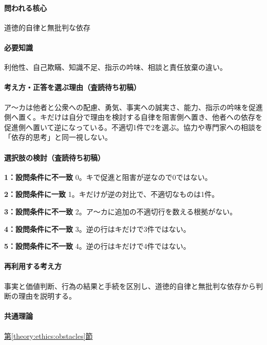 \paragraph{問われる核心} 道徳的自律と無批判な依存

\paragraph{必要知識} 利他性、自己欺瞞、知識不足、指示の吟味、相談と責任放棄の違い。

\paragraph{考え方・正答を選ぶ理由（査読待ち初稿）} ア〜カは他者と公衆への配慮、勇気、事実への誠実さ、能力、指示の吟味を促進側へ置く。キだけは自分で理由を検討する自律を阻害側へ置き、他者への依存を促進側へ置いて逆になっている。不適切1件で2を選ぶ。協力や専門家への相談を「依存的思考」と同一視しない。

\paragraph{選択肢の検討（査読待ち初稿）}\mbox{}\par

\noindent\textbf{1：設問条件に不一致} 0。キで促進と阻害が逆なので0ではない。\par

\noindent\textbf{2：設問条件に一致} 1。キだけが逆の対比で、不適切なものは1件。\par

\noindent\textbf{3：設問条件に不一致} 2。ア〜カに追加の不適切行を数える根拠がない。\par

\noindent\textbf{4：設問条件に不一致} 3。逆の行はキだけで3件ではない。\par

\noindent\textbf{5：設問条件に不一致} 4。逆の行はキだけで4件ではない。\par

\paragraph{再利用する考え方} 事実と価値判断、行為の結果と手続を区別し、道徳的自律と無批判な依存から判断の理由を説明する。

\paragraph{共通理論} \hyperref[theory:ethics:obstacles]{第\ref*{theory:ethics:obstacles}節}

